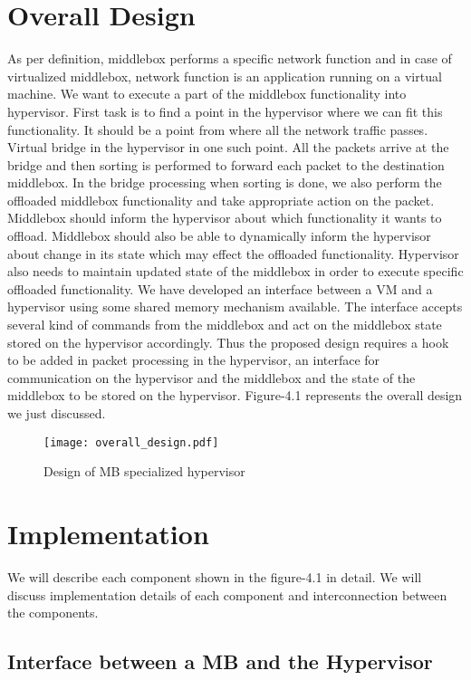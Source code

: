 \documentclass[a4paper,11pt]{report}
\begin{document}
\section{Overall Design}
As per definition, middlebox performs a specific network function and in case of virtualized middlebox, network function is an application running on a virtual machine. We want to execute a part of the middlebox functionality into hypervisor. First task is to find a point in the hypervisor where we can fit this functionality. It should be a point from where all the network traffic passes. Virtual bridge in the hypervisor in one such point. All the packets arrive at the bridge and then sorting is performed to forward each packet to the destination middlebox. In the bridge processing when sorting is done, we also perform the offloaded middlebox functionality and take appropriate action on the packet. Middlebox should inform the hypervisor about which functionality it wants to offload. Middlebox should also be able to dynamically inform the hypervisor about change in its state which may effect the offloaded functionality. Hypervisor also needs to maintain updated state of the middlebox in order to execute specific offloaded functionality. We have developed an interface between a VM and a hypervisor using some shared memory mechanism available. The interface accepts several kind of commands from the middlebox and act on the middlebox state stored on the hypervisor accordingly. Thus the proposed design requires a hook to be added in packet processing in the hypervisor, an interface for communication on the hypervisor and the middlebox and the state of the middlebox to be stored on the hypervisor. Figure-4.1 represents the overall design we just discussed.
\begin{figure}[h]
\centering
\texttt{[image: overall\_design.pdf]}
\caption{Design of MB specialized hypervisor}
\end{figure}   
            
\section{Implementation}
We will describe each component shown in the figure-4.1 in detail. We will discuss implementation details of each component and interconnection between the components.
\subsection{Interface between a MB and the Hypervisor}
\end{document}
